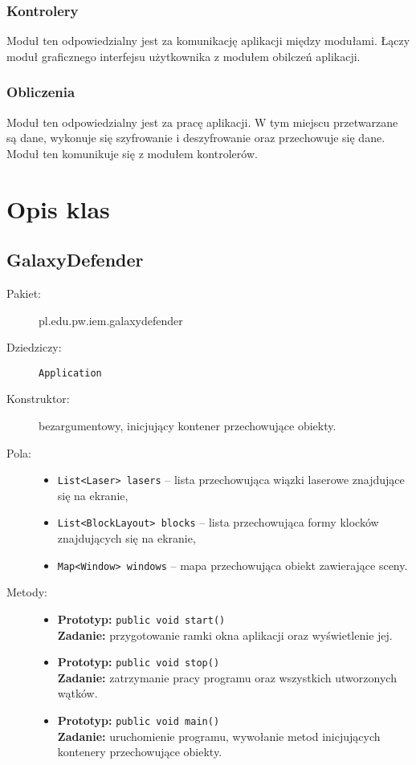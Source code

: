 \documentclass[a4paper]{article}
\newcommand{\prog}{\texttt}
\begin{document}
\subsubsection{Kontrolery}
Moduł ten odpowiedzialny jest za komunikację aplikacji między modułami. Łączy moduł graficznego interfejsu użytkownika z modułem obilczeń aplikacji.

\subsubsection{Obliczenia}
Moduł ten odpowiedzialny jest za pracę aplikacji. W tym miejscu przetwarzane są dane, wykonuje się szyfrowanie i deszyfrowanie oraz przechowuje się dane. Moduł ten komunikuje się z modułem kontrolerów.

\section{Opis klas}
\subsection{GalaxyDefender}
\begin{description}
    \item[Pakiet:] pl.edu.pw.iem.galaxydefender
    \item[Dziedziczy:] \prog{Application}
    \item[Konstruktor:] bezargumentowy, inicjujący kontener przechowujące obiekty.
    \item[Pola:] \hfill
    \begin{itemize}
        \item \prog{List<Laser> lasers} -- lista przechowująca wiązki laserowe znajdujące się na ekranie,
        \item \prog{List<BlockLayout> blocks} -- lista przechowująca formy klocków znajdujących się na ekranie,
        \item \prog{Map<Window> windows} -- mapa przechowująca obiekt zawierające sceny.
    \end{itemize}
    \item[Metody:] \hfill
    \begin{itemize}
        \item \textbf{Prototyp:} \prog{public void start()}\\\textbf{Zadanie:} przygotowanie ramki okna aplikacji oraz wyświetlenie jej.
        \item \textbf{Prototyp:} \prog{public void stop()}\\\textbf{Zadanie:} zatrzymanie pracy programu oraz wszystkich utworzonych wątków.
        \item \textbf{Prototyp:} \prog{public void main()}\\\textbf{Zadanie:} uruchomienie programu, wywołanie metod inicjujących kontenery przechowujące obiekty.
    \end{itemize} 
\end{description}
\end{document}

